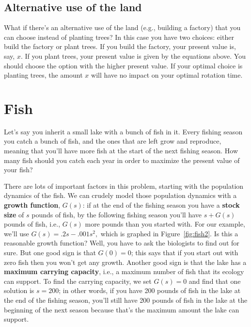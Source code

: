 \subsection*{Alternative use of the land}

What if there's an alternative use of the land (e.g., building a factory) that you can choose instead of planting trees? In this case you have two choices: either build the factory or plant trees. If you build the factory, your present value is, say, $x$. If you plant trees, your present value is given by the equations above. You should choose the option with the higher present value. If your optimal choice is planting trees, the amount $x$ will have no impact on your optimal rotation time. 

\section{Fish}
Let's say you inherit a small lake with a bunch of fish in it. Every fishing season you catch a bunch of fish, and the ones that are left grow and reproduce, meaning that you'll have more fish at the start of the next fishing season. How many fish should you catch each year in order to maximize the present value of your fish?

There are lots of important factors in this problem, starting with the population dynamics of the fish. We can crudely model those population dynamics with a \textbf{growth function}, $G(s)$: if at the end of the fishing season you have a \textbf{stock size} of $s$ pounds of fish, by the following fishing season you'll have $s+G(s)$ pounds of fish, i.e., $G(s)$ more pounds than you started with. For our example, we'll use $G(s)=.2s - .001s^2,$ which is graphed in Figure~\ref{fig:fish2}. Is this a reasonable growth function? Well, you have to ask the biologists to find out for sure. But one good sign is that $G(0)=0$; this says that if you start out with zero fish then you won't get any growth. Another good sign is that the lake has a \textbf{maximum carrying capacity}, i.e., a maximum number of fish that its ecology can support. To find the carrying capacity, we set $G(s)=0$ and find that one solution is $s=200$; in other words, if you have 200 pounds of fish in the lake at the end of the fishing season, you'll still have 200 pounds of fish in the lake at the beginning of the next season because that's the maximum amount the lake can support.

